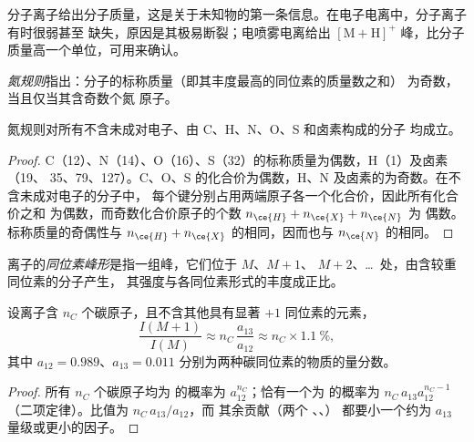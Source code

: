分子离子给出分子质量，这是关于未知物的第一条信息。在电子电离中，分子离子有时很弱甚至
缺失，原因是其极易断裂；电喷雾电离给出 $[\mathrm M +
\mathrm H]^+$ 峰，比分子质量高一个单位，可用来确认。

\begin{definition}[氮规则]\label{def:b2:mass-spec-atomic:nitrogen-rule}
\emph{氮规则}指出：分子的标称质量（即其丰度最高的同位素的质量数之和）
为奇数，当且仅当其含奇数个氮
原子。
\end{definition}

\begin{proposition}[氮规则的有效性]\label{prop:b2:mass-spec-atomic:nitrogen-rule}
氮规则对所有不含未成对电子、由 C、H、N、O、S 和卤素构成的分子
均成立。
\end{proposition}

\begin{proof}
C（12）、N（14）、O（16）、S（32）的标称质量为偶数，H（1）及卤素（19、
35、79、127）。C、O、S 的化合价为偶数，H、N 及卤素的为奇数。在不含未成对电子的分子中，
每个键分别占用两端原子各一个化合价，因此所有化合价之和
为偶数，而奇数化合价原子的个数 $n_{\ce{H}} + n_{\ce{X}} + n_{\ce{N}}$ 为
偶数。标称质量的奇偶性与 $n_{\ce{H}} + n_{\ce{X}}$ 的相同，因而也与
$n_{\ce{N}}$ 的相同。
\end{proof}

\begin{definition}[同位素峰形]\label{def:b2:mass-spec-atomic:isotope-pattern}
离子的\emph{同位素峰形}是指一组峰，它们位于 $M$、$M+1$、
$M+2$、\dots\ 处，由含较重同位素的分子产生，
其强度与各同位素形式的丰度成正比。
\end{definition}

\begin{proposition}[$M+1$ 峰]\label{prop:b2:mass-spec-atomic:m-plus-one}
设离子含 $n_C$ 个碳原子，且不含其他具有显著 $+1$ 同位素的元素，
\begin{equation*}
\frac{I(M+1)}{I(M)} \approx n_C\,\frac{a_{13}}{a_{12}} \approx n_C \times 1.1~\%,
\end{equation*}
其中 $a_{12} = 0.989$、$a_{13} = 0.011$ 分别为两种碳同位素的物质的量分数。
\end{proposition}

\begin{proof}
所有 $n_C$ 个碳原子均为  的概率为 $a_{12}^{n_C}$；恰有一个为
 的概率为 $n_C\,a_{13}a_{12}^{n_C - 1}$（二项定律）。比值为 $n_C\,a_{13}/a_{12}$，而
其余贡献（两个 、、）
都要小一个约为 $a_{13}$ 量级或更小的因子。
\end{proof}

